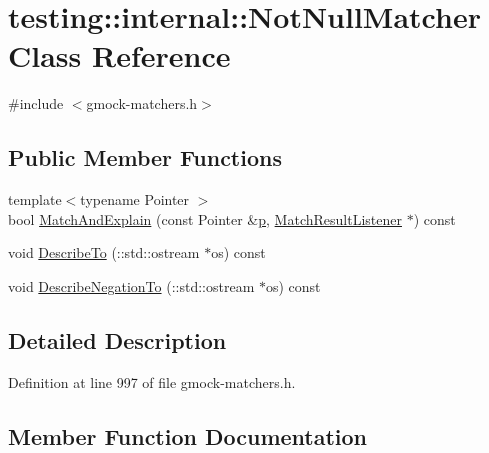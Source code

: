 \hypertarget{classtesting_1_1internal_1_1_not_null_matcher}{}\section{testing\+:\+:internal\+:\+:Not\+Null\+Matcher Class Reference}
\label{classtesting_1_1internal_1_1_not_null_matcher}


{\ttfamily \#include $<$gmock-\/matchers.\+h$>$}

\subsection*{Public Member Functions}
\begin{DoxyCompactItemize}
\item 
{\footnotesize template$<$typename Pointer $>$ }\\bool \hyperlink{classtesting_1_1internal_1_1_not_null_matcher_a404445d437926dcb6ad9cf3204bfe7ee}{Match\+And\+Explain} (const Pointer \&\hyperlink{jquery_8js_a2335e57f79b6acfb6de59c235dc8a83e}{p}, \hyperlink{classtesting_1_1_match_result_listener}{Match\+Result\+Listener} $\ast$) const 
\item 
void \hyperlink{classtesting_1_1internal_1_1_not_null_matcher_a9a68844a1bed535a945f5c68d1adb3e9}{Describe\+To} (\+::std\+::ostream $\ast$os) const 
\item 
void \hyperlink{classtesting_1_1internal_1_1_not_null_matcher_a50bc1dc91b28953960bbeb3fa4b11f74}{Describe\+Negation\+To} (\+::std\+::ostream $\ast$os) const 
\end{DoxyCompactItemize}


\subsection{Detailed Description}


Definition at line 997 of file gmock-\/matchers.\+h.



\subsection{Member Function Documentation}
